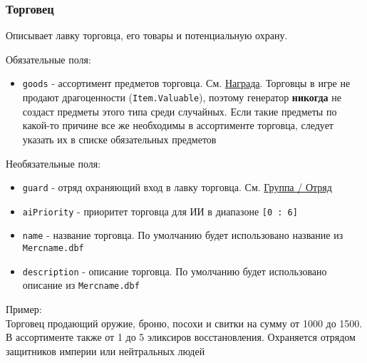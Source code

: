 \subsubsection{Торговец}
\label{merchant}
Описывает лавку торговца, его товары и потенциальную охрану.

Обязательные поля:
\begin{itemize}
\item \texttt{goods} - ассортимент предметов торговца. См. \hyperref[loot]{Награда}. Торговцы в игре не продают драгоценности (\texttt{Item.Valuable}), поэтому генератор \textbf{никогда} не создаст предметы этого типа среди случайных. Если такие предметы по какой-то причине все же необходимы в ассортименте торговца, следует указать их в списке обязательных предметов
\end{itemize}

Необязательные поля:
\begin{itemize}
\item \texttt{guard} - отряд охраняющий вход в лавку торговца. См. \hyperref[group]{Группа / Отряд}
\item \texttt{aiPriority} - приоритет торговца для ИИ в диапазоне \texttt{[0 : 6]}
\item \texttt{name} - название торговца. По умолчанию будет использовано название из \texttt{Mercname.dbf}
\item \texttt{description} - описание торговца. По умолчанию будет использовано описание из \texttt{Mercname.dbf}
\end{itemize}

Пример:\\
Торговец продающий оружие, броню, посохи и свитки на сумму от 1000 до 1500.
В ассортименте также от 1 до 5 эликсиров восстановления.
Охраняется отрядом защитников империи или нейтральных людей

\begin{figure}[H]

\end{figure}